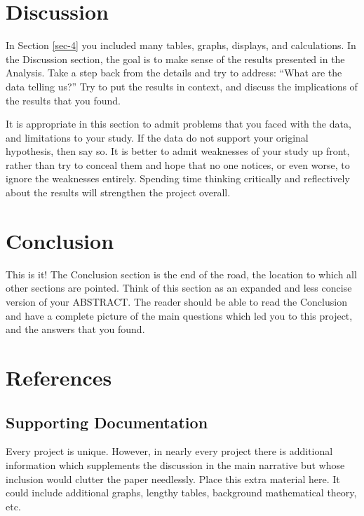 \documentclass[11pt]{article}
\begin{document}
\newpage

\section[Discussion]{Discussion}
\label{sec-5}

In Section \ref{sec-4} you included many tables, graphs, displays,
and calculations. In the Discussion section, the goal is to make sense
of the results presented in the Analysis. Take a step back from the
details and try to address: “What are the data telling us?” Try to put
the results in context, and discuss the implications of the results
that you found.

It is appropriate in this section to admit problems that you faced
with the data, and limitations to your study. If the data do not
support your original hypothesis, then say so. It is better to admit
weaknesses of your study up front, rather than try to conceal them and
hope that no one notices, or even worse, to ignore the weaknesses
entirely. Spending time thinking critically and reflectively about the
results will strengthen the project overall.

\newpage

\section[Conclusion]{Conclusion}
\label{sec-6}

This is it! The Conclusion section is the end of the road, the
location to which all other sections are pointed. Think of this
section as an expanded and less concise version of your ABSTRACT.  The
reader should be able to read the Conclusion and have a complete
picture of the main questions which led you to this project, and the
answers that you found.

\newpage

\section[References]{References}
\label{sec-7}



\subsection[Supporting Documentation]{Supporting Documentation}
\label{sec-7-1}

Every project is unique. However, in nearly every project there is
additional information which supplements the discussion in the main
narrative but whose inclusion would clutter the paper
needlessly. Place this extra material here. It could include
additional graphs, lengthy tables, background mathematical theory,
etc.
\end{document}
